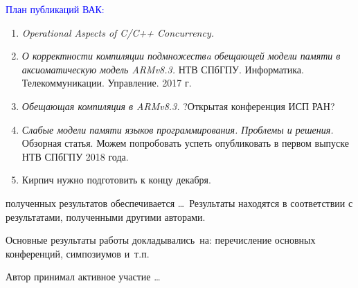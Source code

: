 \textcolor{blue}{План публикаций ВАК:}
\begin{enumerate}
  \item \emph{Operational Aspects of C/C++ Concurrency.}
  

    

  \item \emph{О корректности компиляции подмножествa обещающей модели памяти в аксиоматическую модель ARMv8.3.}
    НТВ СПбГПУ. Информатика. Телекоммуникации. Управление. 2017 г.

  \item \emph{Обещающая компиляция в ARMv8.3.}
    ?Открытая конференция ИСП РАН?
    
  \item \emph{Слабые модели памяти языков программирования. Проблемы и решения.}
    Обзорная статья. Можем попробовать успеть опубликовать в первом выпуске НТВ СПбГПУ 2018 года.
    
  \item Кирпич нужно подготовить к концу декабря.
\end{enumerate}

{\reliability} полученных результатов обеспечивается \ldots \ Результаты находятся в соответствии с результатами, полученными другими авторами.

{\probation}
Основные результаты работы докладывались~на:
перечисление основных конференций, симпозиумов и~т.\:п.

{\contribution} Автор принимал активное участие \ldots


